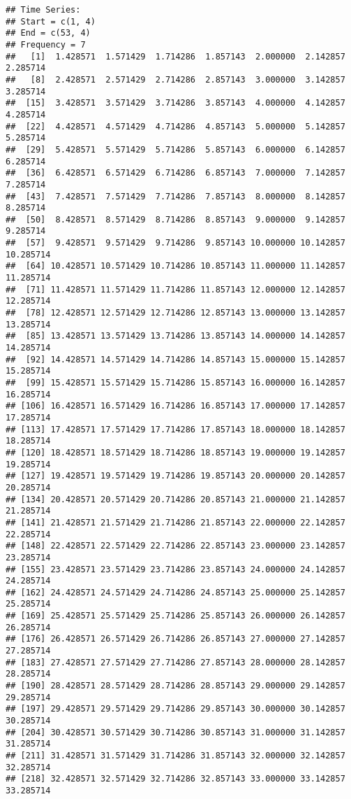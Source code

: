 \documentclass[]{book}
\begin{document}
\begin{verbatim}
## Time Series:
## Start = c(1, 4) 
## End = c(53, 4) 
## Frequency = 7 
##   [1]  1.428571  1.571429  1.714286  1.857143  2.000000  2.142857  2.285714
##   [8]  2.428571  2.571429  2.714286  2.857143  3.000000  3.142857  3.285714
##  [15]  3.428571  3.571429  3.714286  3.857143  4.000000  4.142857  4.285714
##  [22]  4.428571  4.571429  4.714286  4.857143  5.000000  5.142857  5.285714
##  [29]  5.428571  5.571429  5.714286  5.857143  6.000000  6.142857  6.285714
##  [36]  6.428571  6.571429  6.714286  6.857143  7.000000  7.142857  7.285714
##  [43]  7.428571  7.571429  7.714286  7.857143  8.000000  8.142857  8.285714
##  [50]  8.428571  8.571429  8.714286  8.857143  9.000000  9.142857  9.285714
##  [57]  9.428571  9.571429  9.714286  9.857143 10.000000 10.142857 10.285714
##  [64] 10.428571 10.571429 10.714286 10.857143 11.000000 11.142857 11.285714
##  [71] 11.428571 11.571429 11.714286 11.857143 12.000000 12.142857 12.285714
##  [78] 12.428571 12.571429 12.714286 12.857143 13.000000 13.142857 13.285714
##  [85] 13.428571 13.571429 13.714286 13.857143 14.000000 14.142857 14.285714
##  [92] 14.428571 14.571429 14.714286 14.857143 15.000000 15.142857 15.285714
##  [99] 15.428571 15.571429 15.714286 15.857143 16.000000 16.142857 16.285714
## [106] 16.428571 16.571429 16.714286 16.857143 17.000000 17.142857 17.285714
## [113] 17.428571 17.571429 17.714286 17.857143 18.000000 18.142857 18.285714
## [120] 18.428571 18.571429 18.714286 18.857143 19.000000 19.142857 19.285714
## [127] 19.428571 19.571429 19.714286 19.857143 20.000000 20.142857 20.285714
## [134] 20.428571 20.571429 20.714286 20.857143 21.000000 21.142857 21.285714
## [141] 21.428571 21.571429 21.714286 21.857143 22.000000 22.142857 22.285714
## [148] 22.428571 22.571429 22.714286 22.857143 23.000000 23.142857 23.285714
## [155] 23.428571 23.571429 23.714286 23.857143 24.000000 24.142857 24.285714
## [162] 24.428571 24.571429 24.714286 24.857143 25.000000 25.142857 25.285714
## [169] 25.428571 25.571429 25.714286 25.857143 26.000000 26.142857 26.285714
## [176] 26.428571 26.571429 26.714286 26.857143 27.000000 27.142857 27.285714
## [183] 27.428571 27.571429 27.714286 27.857143 28.000000 28.142857 28.285714
## [190] 28.428571 28.571429 28.714286 28.857143 29.000000 29.142857 29.285714
## [197] 29.428571 29.571429 29.714286 29.857143 30.000000 30.142857 30.285714
## [204] 30.428571 30.571429 30.714286 30.857143 31.000000 31.142857 31.285714
## [211] 31.428571 31.571429 31.714286 31.857143 32.000000 32.142857 32.285714
## [218] 32.428571 32.571429 32.714286 32.857143 33.000000 33.142857 33.285714

\end{verbatim}
\end{document}
